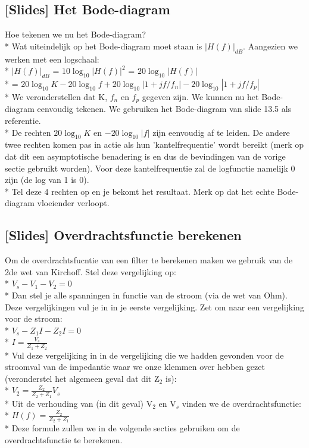 \documentclass[10pt]{article}
\begin{document}
\subsection{[Slides] Het Bode-diagram}
Hoe tekenen we nu het Bode-diagram?\\*
Wat uiteindelijk op het Bode-diagram moet staan is $|H(f)|_{dB}$. Aangezien we werken met een logschaal:\\*
$|H(f)|_{dB}$ = $10\log_{10}{|H(f)|^2}$ = $20\log_{10}{|H(f)|}$\\*
= $20\log_{10}{K} - 20\log_{10}{f} + 20\log_{10}{|1+jf/f_n|} - 20\log_{10}{|1+jf/f_p|}$\\*
We veronderstellen dat K, $f_n$ en $f_p$ gegeven zijn. We kunnen nu het Bode-diagram eenvoudig tekenen. We gebruiken het Bode-diagram van slide 13.5 als referentie.\\*
De rechten $20\log_{10}{K}$ en $-20\log_{10}{|f|}$ zijn eenvoudig af te leiden. De andere twee rechten komen pas in actie als hun 'kantelfrequentie' wordt bereikt (merk op dat dit een asymptotische benadering is en dus de bevindingen van de vorige sectie gebruikt worden). Voor deze kantelfrequentie zal de logfunctie namelijk 0 zijn (de log van 1 is 0).\\*
Tel deze 4 rechten op en je bekomt het resultaat. Merk op dat het echte Bode-diagram vloeiender verloopt.
\subsection{[Slides] Overdrachtsfunctie berekenen}
Om de overdrachtsfucntie van een filter te berekenen maken we gebruik van de 2de wet van Kirchoff. Stel deze vergelijking op:\\*
$V_s - V_1 - V_2 = 0$\\*
Dan stel je alle spanningen in functie van de stroom (via de wet van Ohm). Deze vergelijkingen vul je in in je eerste vergelijking. Zet om naar een vergelijking voor de stroom:\\*
$V_s - Z_1I - Z_2I = 0$\\*
$I = \frac{V_s}{Z_1 + Z_2}$\\*
Vul deze vergelijking in in de vergelijking die we hadden gevonden voor de stroomval van de impedantie waar we onze klemmen over hebben gezet (veronderstel het algemeen geval dat dit Z$_2$ is):\\*
$V_2 = \frac{Z_2}{Z_2 + Z_1}V_s$\\*
Uit de verhouding van (in dit geval) V$_2$ en V$_s$ vinden we de overdrachtsfunctie:\\*
$H(f) = \frac{Z_2}{Z_2 + Z_1}$\\*
Deze formule zullen we in de volgende secties gebruiken om de overdrachtsfunctie te berekenen.
\end{document}
